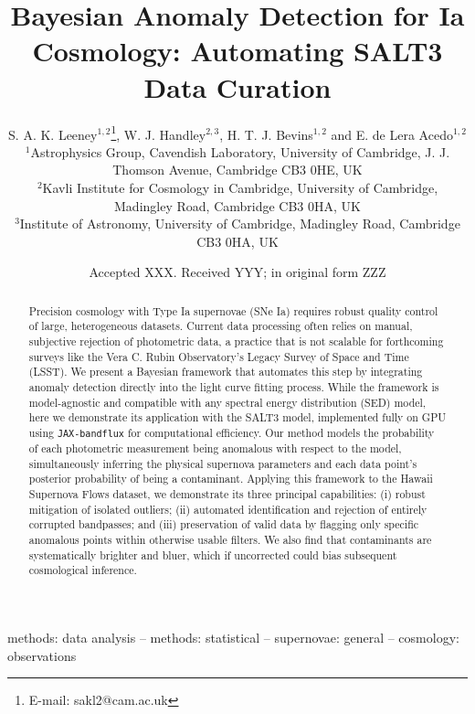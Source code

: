\documentclass[fleqn,usenatbib]{mnras}
\title[Bayesian Anomaly Detection for Ia Cosmology]{Bayesian Anomaly Detection for Ia Cosmology: Automating SALT3 Data Curation}
\author[Leeney et al.]{
S. A. K. Leeney$^{1,2}$\thanks{E-mail: sakl2@cam.ac.uk},
W. J. Handley$^{2,3}$,
H. T. J. Bevins$^{1,2}$
and E. de Lera Acedo$^{1,2}$
\\
$^{1}$Astrophysics Group, Cavendish Laboratory, University of Cambridge, J. J. Thomson Avenue, Cambridge CB3 0HE, UK\\
$^{2}$Kavli Institute for Cosmology in Cambridge, University of Cambridge, Madingley Road, Cambridge CB3 0HA, UK\\
$^{3}$Institute of Astronomy, University of Cambridge, Madingley Road, Cambridge CB3 0HA, UK
}
\date{Accepted XXX. Received YYY; in original form ZZZ}
\begin{document}
\label{firstpage}
\pagerange{\pageref{firstpage}--\pageref{lastpage}}
\maketitle

\begin{abstract}
Precision cosmology with Type Ia supernovae (SNe Ia) requires robust quality control of large, heterogeneous datasets. Current data processing often relies on manual, subjective rejection of photometric data, a practice that is not scalable for forthcoming surveys like the Vera C. Rubin Observatory's Legacy Survey of Space and Time (LSST). We present a Bayesian framework that automates this step by integrating anomaly detection directly into the light curve fitting process. While the framework is model-agnostic and compatible with any spectral energy distribution (SED) model, here we demonstrate its application with the SALT3 model, implemented fully on GPU using \texttt{JAX-bandflux} for computational efficiency. Our method models the probability of each photometric measurement being anomalous with respect to the model, simultaneously inferring the physical supernova parameters and each data point's posterior probability of being a contaminant. Applying this framework to the Hawaii Supernova Flows dataset, we demonstrate its three principal capabilities: (i) robust mitigation of isolated outliers; (ii) automated identification and rejection of entirely corrupted bandpasses; and (iii) preservation of valid data by flagging only specific anomalous points within otherwise usable filters. We also find that contaminants are systematically brighter and bluer, which if uncorrected could bias subsequent cosmological inference. 
\end{abstract}

\begin{keywords}
methods: data analysis -- methods: statistical -- supernovae: general -- cosmology: observations
\end{keywords}










\end{document}
